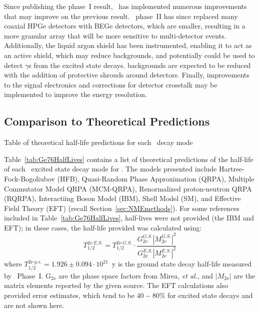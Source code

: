 \documentclass[/main.tex]{subfiles}
\begin{document}
Since publishing the phase~I result\cite{gerdaESresult}, \Gerda\ has implemented numerous improvements that may improve on the previous result\cite{gerda2018}.
\Gerda\ phase~II has since replaced many coaxial HPGe detectors with BEGe detectors, which are smaller, resulting in a more granular array that will be more sensitive to multi-detector events.
Additionally, the liquid argon shield has been instrumented, enabling it to act as an active shield, which may reduce backgrounds, and potentially could be used to detect $\gamma$s from the excited state decays.
 backgrounds are expected to be reduced with the addition of protective shrouds around detectors.
Finally, improvements to the signal electronics and corrections for detector crosstalk may be implemented to improve the energy resolution.

\subsection{Comparison to Theoretical Predictions}
\begin{table}[p]
  \caption[Current half-live limits and predictions for all \tnbb-decay modes of ]{\label{tab:Ge76HalfLives}
    Table of theoretical half-life predictions for each \tnbb\ decay mode
  }
  \small
  
\end{table}
Table~\ref{tab:Ge76HalfLives} contains a list of theoretical predictions of the half-life of each \tnbb\ excited state decay mode for .
The models presented include Hartree-Fock-Bogoliubov (HFB), Quasi-Random Phase Approximation (QRPA), Multiple Commutator Model QRPA (MCM-QRPA), Renormalized proton-neutron QRPA (RQRPA), Interactiing Boson Model (IBM), Shell Model (SM), and  Effective Field Theory (EFT) (recall Section~\ref{sec:NMEmethods}).
For some references included in Table~\ref{tab:Ge76HalfLives}, half-lives were not provided (the IBM\cite{barea2013, barea2015} and EFT\cite{menendez2018}); in these cases, the half-life provided was calculated using:
\begin{equation} \label{eq:hlcalc}
  T^{2\nu~E.S.}_{1/2} = T^{2\nu~G.S.}_{1/2}\cdot\frac{G_{2\nu}^{G.S.}|M_{2\nu}^{G.S.}|^2}{G_{2\nu}^{E.S.}|M_{2\nu}^{E.S.}|^2}
\end{equation}
where $T_{1/2}^{2\nu~g.s.}=1.926\pm0.094\cdot10^{21}$~y is the ground state decay half-life measured by \Gerda\ Phase~I.
$\mathrm{G}_{2\nu}$ are the phase space factors from Mirea, \textit{et al.}\cite{mirea2015}, and $|M_{2\nu}|$ are the matrix elements reported by the given source.
The EFT calculations\cite{menendez2018} also provided error estimates, which tend to be $40-80\%$ for excited state decays and are not shown here.
\end{document}
